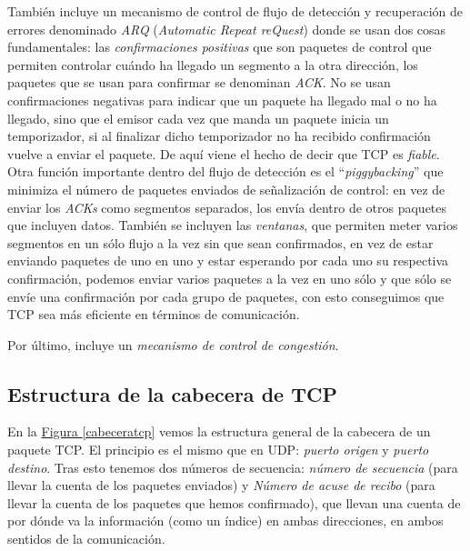 \documentclass[10pt,a4paper,spanish]{report}
\begin{document}
También incluye un mecanismo de control de flujo de detección y recuperación de errores denominado \textit{\textcolor{tema3}{ARQ}} (\textit{\textcolor{tema3}{Automatic Repeat reQuest}}) donde se usan dos cosas fundamentales: las \textit{\textcolor{tema3}{confirmaciones positivas}} que son paquetes de control que permiten controlar cuándo ha llegado un segmento a la otra dirección, los paquetes que se usan para confirmar se denominan \textit{\textcolor{tema3}{ACK}}. No se usan confirmaciones negativas para indicar que un paquete ha llegado mal o no ha llegado, sino que el emisor cada vez que manda un paquete inicia un temporizador, si al finalizar dicho temporizador no ha recibido confirmación vuelve a enviar el paquete. De aquí viene el hecho de decir que TCP es \textit{\textcolor{tema3}{fiable}}. Otra función importante dentro del flujo de detección es el ``\textit{\textcolor{tema3}{piggybacking}}'' que minimiza el número de paquetes enviados de señalización de control: en vez de enviar los \textit{\textcolor{tema3}{ACKs}} como segmentos separados, los envía dentro de otros paquetes que incluyen datos. También se incluyen las \textcolor{tema3}{\textit{ventanas}}, que permiten meter varios segmentos en un sólo flujo a la vez sin que sean confirmados, en vez de estar enviando paquetes de uno en uno y estar esperando por cada uno su respectiva confirmación, podemos enviar varios paquetes a la vez en uno sólo y que sólo se envíe una confirmación por cada grupo de paquetes, con esto conseguimos que  TCP sea más eficiente en términos de comunicación.

Por último, incluye un \textit{\textcolor{tema3}{mecanismo de control de congestión}}.

\subsection{\textcolor{tema3}Estructura de la cabecera de TCP}
En la \hyperref[cabeceratcp]{Figura \ref*{cabeceratcp}} vemos la estructura general de la cabecera de un paquete TCP. El principio es el mismo que en UDP: \textit{\textcolor{tema3}{puerto origen}} y \textit{\textcolor{tema3}{puerto destino}}. Tras esto tenemos dos números de secuencia: \textit{\textcolor{tema3}{número de secuencia}} (para llevar la cuenta de los paquetes enviados) y \textit{\textcolor{tema3}{Número de acuse de recibo}} (para llevar la cuenta de los paquetes que hemos confirmado), que llevan una cuenta de por dónde va la información (como un índice) en ambas direcciones, en ambos sentidos de la comunicación.
\end{document}
